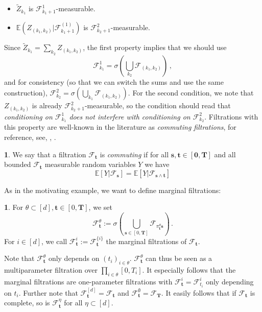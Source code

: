\documentclass[11pt,oneside,english,reqno]{amsart}
\numberwithin{equation}{section}
\numberwithin{figure}{section}
\theoremstyle{plain}
\theoremstyle{definition}
\newtheorem{defn}[thm]{\protect\definitionname}
\theoremstyle{remark}
\theoremstyle{plain}
\theoremstyle{plain}
\theoremstyle{plain}
\theoremstyle{plain}
\theoremstyle{plain}
\providecommand{\definitionname}{Definition}
\newcommand{\cF}{\mathcal{F}}
\newcommand{\EE}{\mathbb{E}}
\newcommand{\bT}{\mathbf{T}}
\newcommand{\boo}{\mathbf{0}}
\newcommand{\bs}{\mathbf{s}}
\newcommand{\bt}{\mathbf{t}}
\begin{document}
%
\begin{itemize}
    \item $\tilde Z_{k_1}$ is $\cF_{k_1+1}^1$-measurable.
    \item $\EE(Z_{(k_1,k_2)}\vert\cF^{(1)}_{k_1+1})$ is $\cF_{k_2+1}^2$-measurable.
\end{itemize}
%
Since $\tilde Z_{k_1} = \sum_{k_2} Z_{(k_1,k_2)}$, the first property implies that we should use
%
\begin{equation*}
    \cF^1_{k_1} = \sigma\left(\bigcup_{k_2} \cF_{(k_1,k_2)}\right)\,,
\end{equation*}
%
and for consistency (so that we can switch the sums and use the same construction), $\cF^2_{k_2} = \sigma\left(\bigcup_{k_1} \cF_{(k_1,k_2)}\right)$. For the second condition, we note that $Z_{(k_1,k_2)}$ is already $\cF_{k_2+1}^2$-measurable, so the condition should read that \emph{conditioning on $\cF^1_{k_1}$ does not interfere with conditioning on $\cF^2_{k_2}$}. Filtrations with this property are well-known in the literature as \emph{commuting filtrations}, for reference, see\cite{Imkeller85}, \cite{Walsh86}, \cite{Khoshnevisan02}.
%

\begin{defn}
    We say that a filtration $\cF_\bt$ is {\em commuting} if for all $\bs,\bt\in [\boo,\bT]$ and all bounded $\cF_\bt$ measurable random variables $Y$ we have 
    \begin{equation}\label{eq:commuting}
        \EE[Y|\cF_\bs]=\EE[Y|\cF_{\bs\wedge \bt}]
    \end{equation}
    \label{commuting def}
\end{defn}
%
\noindent As in the motivating example, we want to define marginal filtrations:
%
\begin{defn}
    For $\theta\subset[d], \bt\in[0,\bT]$, we set
%
    \begin{equation*}
        \cF^\theta_\bt := \sigma\left(\bigcup_{\bs\in[0,\bT]} \cF_{\pi^\theta_\bt \bs}\right)\,.
    \end{equation*}
%
    For $i\in[d]$, we call $\cF^i_\bt := \cF^{\{i\}}_\bt$ the marginal filtrations of $\cF_\bt$.
\end{defn}
%
\noindent Note that $\cF_\bt^\theta$ only depends on $(t_i)_{i\in\theta}$. $\cF_\bt^\theta$ can thus be seen as a multiparameter filtration over $\prod_{i\in\theta} [0,T_i]$. It especially follows that the marginal filtrations are one-parameter filtrations with $\cF^i_\bt = \cF^i_{t_i}$ only depending on $t_i$. Further note that $\cF^{[d]}_\bt = \cF_\bt$ and $\cF^\emptyset_\bt = \cF_\bT$. It easily follows that if $\cF_\bt$ is complete, so is $\cF_\bt^\eta$ for all $\eta\subset[d]$.
\end{document}
